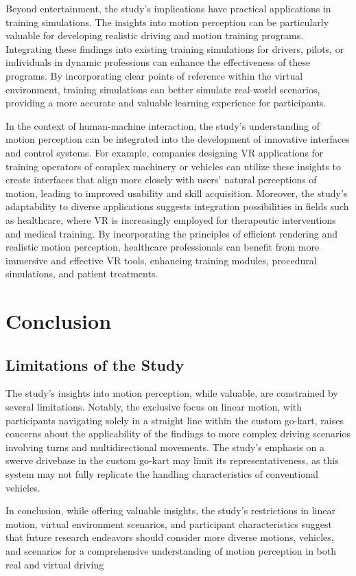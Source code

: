 \documentclass[a4paper, 12pt, oneside]{article}
\begin{document}
        Beyond entertainment, the study's implications have practical applications in training simulations. The insights into motion 
        perception can be particularly valuable for developing realistic driving and motion training programs. Integrating these 
        findings into existing training simulations for drivers, pilots, or individuals in dynamic professions can enhance the 
        effectiveness of these programs. By incorporating clear points of reference within the virtual environment, training 
        simulations can better simulate real-world scenarios, providing a more accurate and valuable learning experience for 
        participants.

        In the context of human-machine interaction, the study's understanding of motion perception can be integrated into the 
        development of innovative interfaces and control systems. For example, companies designing VR applications for training 
        operators of complex machinery or vehicles can utilize these insights to create interfaces that align more closely with 
        users' natural perceptions of motion, leading to improved usability and skill acquisition. Moreover, the study's adaptability
         to diverse applications suggests integration possibilities in fields such as healthcare, where VR is increasingly employed 
         for therapeutic interventions and medical training. By incorporating the principles of efficient rendering and realistic 
         motion perception, healthcare professionals can benefit from more immersive and effective VR tools, enhancing training 
         modules, procedural simulations, and patient treatments.
    
    \section{Conclusion}
        \subsection{Limitations of the Study}
    The study's insights into motion perception, while valuable, are constrained by several limitations. Notably, the exclusive focus 
    on linear motion, with participants navigating solely in a straight line within the custom go-kart, raises concerns about the 
    applicability of the findings to more complex driving scenarios involving turns and multidirectional movements. The study's emphasis
    on a swerve drivebase in the custom go-kart may limit its representativeness, as this system may not fully replicate the handling 
    characteristics of conventional vehicles.

    In conclusion, while offering valuable insights, the study's restrictions in linear motion, virtual environment scenarios, and 
    participant characteristics suggest that future research endeavors should consider more diverse motions, vehicles, and scenarios 
    for a comprehensive understanding of motion perception in both real and virtual driving 
\end{document}

